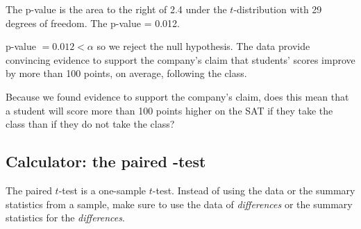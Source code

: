 \begin{examplewrap}
\begin{nexample}
\begin{description}
The p-value is the area to the right of 2.4 under the $t$-distribution with 29 degrees of freedom.  The p-value = 0.012.

\item[\inferencestep{Conclude}]  p-value $=0.012<\alpha$ so we reject the null hypothesis. The data provide convincing evidence to support the company's claim that students' scores improve by more than 100 points, on average, following the class.


\end{description}
\end{nexample}
\end{examplewrap}


\begin{exercisewrap}
\begin{nexercise}
Because we found evidence to support the company's claim, does this mean that a student will score more than 100 points higher on the SAT if they take the class than if they do not take the class?  


\end{nexercise}
\end{exercisewrap}


\D{\newpage}

\subsection[Calculator: the paired $t$-test]{Calculator: the paired -test}
The paired $t$-test is a one-sample $t$-test. Instead of using the data or the summary statistics from a sample, make sure to use the data of \emph{differences} or the summary statistics for the \emph{differences}.
\label{matchedpairsttest}


